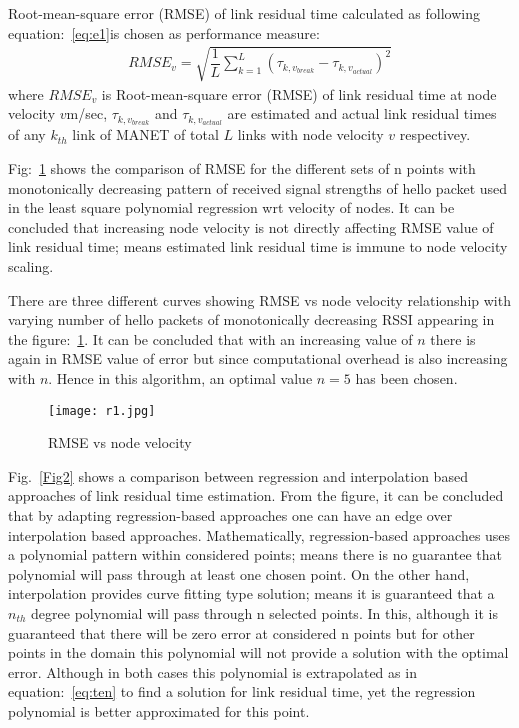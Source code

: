 \documentclass[runningheads]{llncs}
\begin{document}
	\par Root-mean-square error (RMSE) of link residual time  calculated  as following equation:~\ref{eq:e1}is chosen as performance measure:
	\begin{equation}%
	\begin{aligned}
	RMSE_{v}=\sqrt{\dfrac{1}{L}\sum_{k=1}^{L} (\tau_{k,v_{break}}-\tau_{k,v_{actual}})^{2}}
	\end{aligned}\label{eq:e1}
	\end{equation} 
	where    $RMSE_{v}$ is  Root-mean-square error (RMSE) of link residual time at node velocity $v$m/sec, $\tau_{k,v_{break}}$ and  $\tau_{k,v_{actual}}$ are estimated and actual link residual times of any $k_{th}$ link of MANET of total $L$ links with node velocity $v$ respectivey.        
	
	
	\par
	Fig:~\ref{Fig1} shows the comparison of RMSE for the different sets of n points with monotonically decreasing pattern of received signal strengths of hello packet used in the least square polynomial regression wrt velocity of nodes. It can be concluded that increasing node velocity is not directly affecting RMSE value of link residual time; means estimated link residual time is immune to node velocity scaling. 
	\par
	There are three different curves showing RMSE vs node velocity relationship with varying number of hello packets of monotonically decreasing RSSI appearing in the figure:~\ref{Fig1}. It can be concluded that with an increasing value of $n$ there is again in RMSE value of error but since computational overhead is also increasing with $n$. Hence in this algorithm, an optimal value $n=5$ has been chosen.
	
	
	\begin{center}
		\begin{figure}
			
			\texttt{[image: r1.jpg]}
			\caption{RMSE vs node velocity} \label{Fig1}
			
		\end{figure}
	\end{center}
	\par    
	Fig.~\ref{Fig2} shows a comparison between regression and interpolation based approaches of link residual time estimation. From the figure, it can be concluded that by adapting regression-based approaches one can have an edge over interpolation based approaches. Mathematically, regression-based approaches uses a polynomial pattern within considered points; means there is no guarantee that polynomial will pass through at least one chosen point. On the other hand, interpolation provides curve fitting type solution; means it is guaranteed that a $n_{th}$ degree polynomial will pass through n selected points. In this, although it is guaranteed that there will be zero error at considered n points but for other points in the domain this polynomial will not provide a solution with the optimal error.
	Although in both cases this polynomial is extrapolated as in equation:~\ref{eq:ten} to find a solution for link residual time, yet the regression polynomial is better approximated for this point.
	
\end{document}
